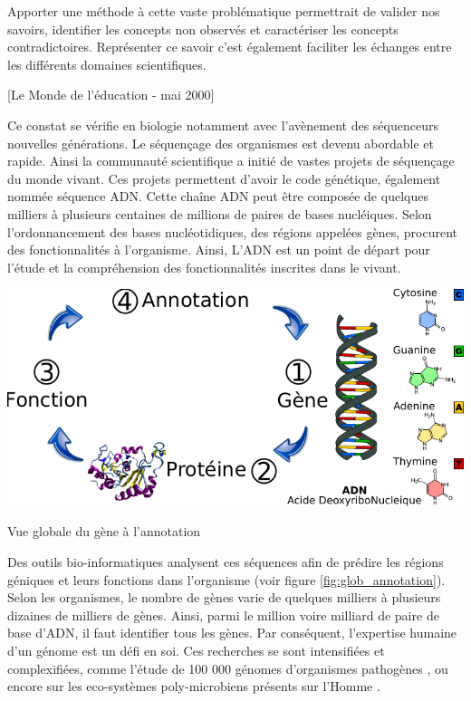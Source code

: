 \begin{refsegment}
Apporter une méthode à cette vaste problématique permettrait de valider nos savoirs, identifier les concepts non observés et caractériser les concepts contradictoires. Représenter ce savoir c’est également faciliter les échanges entre les différents domaines scientifiques.

[Le Monde de l'éducation - mai 2000]

Ce constat se vérifie en biologie notamment avec l'avènement des séquenceurs nouvelles générations. Le séquençage des organismes est devenu abordable et rapide. Ainsi la communauté scientifique a initié de vastes projets de séquençage du monde vivant. Ces projets permettent d'avoir le code génétique, également nommée séquence \gls{ADN}. Cette chaîne \gls{ADN} peut être composée de quelques milliers à plusieurs centaines de millions de paires de bases nucléiques. Selon l'ordonnancement des bases nucléotidiques, des régions appelées gènes, procurent des fonctionnalités à l'organisme. Ainsi, L'\gls{ADN} est un point de départ pour l'étude et la compréhension des fonctionnalités inscrites dans le vivant.


\begin{shadedfigure}
    \centering
    \includegraphics{img/simple_annotation_process.pdf}
    \caption{Vue globale du gène à l'annotation }
    \label{fig:glob_annotation}
\end{shadedfigure}

Des outils bio-informatiques analysent ces séquences afin de prédire les régions géniques et leurs fonctions dans l'organisme (voir figure \ref{fig:glob_annotation}). Selon les organismes, le nombre de gènes varie de quelques milliers à plusieurs dizaines de milliers de gènes. Ainsi, parmi le million voire milliard de paire de base d'\gls{ADN}, il faut identifier tous les gènes. Par conséquent, l'expertise humaine d'un génome est un défi en soi. Ces recherches se sont intensifiées et complexifiées, comme l'étude de 100 000 génomes d'organismes pathogènes \cite{100kfoodborne}, ou encore sur les eco-systèmes poly-microbiens présents sur l'Homme \cite{hmp}.


\end{refsegment}
